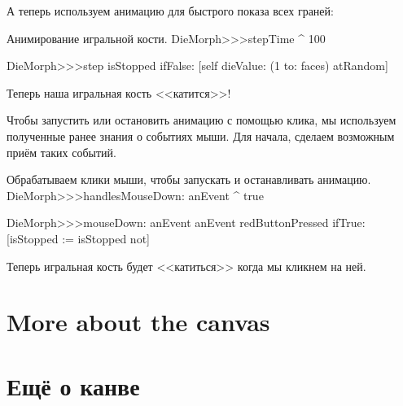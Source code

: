\documentclass[a4paper,10pt,twoside]{book}
\begin{document}
А теперь используем анимацию для быстрого показа всех граней:
\begin{methods}{Анимирование игральной кости.}
DieMorph>>>stepTime
	^ 100

DieMorph>>>step
	isStopped ifFalse: [self dieValue: (1 to: faces) atRandom]
\end{methods}
Теперь наша игральная кость <<катится>>!

Чтобы запустить или остановить анимацию с помощью клика, мы используем полученные ранее знания о событиях мыши.
Для начала, сделаем возможным приём таких событий.

\begin{methods}{Обрабатываем клики мыши, чтобы запускать и останавливать анимацию.}
DieMorph>>>handlesMouseDown: anEvent
	^ true

DieMorph>>>mouseDown: anEvent
	anEvent redButtonPressed
		ifTrue: [isStopped := isStopped not]
\end{methods}
Теперь игральная кость будет <<катиться>> когда мы кликнем на ней.



\section{More about the canvas}
\section{Ещё о канве}
\end{document}
